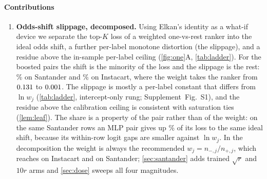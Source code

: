 \documentclass[sigconf,nonacm]{acmart}
\newcommand{\Supp}[1]{Supplement~#1}  %
\begin{document}
\paragraph{Contributions}
\begin{enumerate}[leftmargin=*,nosep]
\item \textbf{Odds-shift slippage, decomposed.} Using Elkan's identity as a what-if device we separate the top-$K$ loss of a weighted one-vs-rest ranker into the ideal odds shift, a further per-label monotone distortion (the slippage), and a residue above the in-sample per-label ceiling (\cref{fig:one}A, \cref{tab:ladder}). For the boosted pairs the shift is the minority of the loss and the slippage is the rest: \noddsShare\% on Santander and \nIoddsShare\% on Instacart, where the weight takes the ranker from $0.131$ to $0.001$. The slippage is mostly a per-label constant that differs from $\ln w_j$ (\cref{tab:ladder}, intercept-only rung; \Supp{Fig.~S1}), and the residue above the calibration ceiling is consistent with saturation ties (\cref{lem:leaf}). The share is a property of the pair rather than of the weight: on the same Santander rows an MLP pair gives up \nModdsShare\% of its loss to the same ideal shift, because its within-row logit gaps are smaller against $\ln w_j$. In the decomposition the weight is always the recommended $w_j=n_{-,j}/n_{+,j}$, which reaches \nIwMax{} on Instacart and \nwMax{} on Santander; \cref{sec:santander} adds trained $\sqrt{r}$ and $10r$ arms and \cref{sec:dose} sweeps all four magnitudes.

\end{enumerate}
\end{document}
